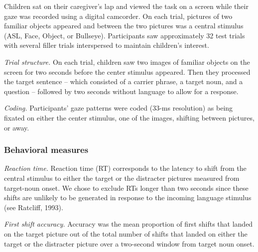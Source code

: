 \documentclass[10pt, letterpaper]{article}
\begin{document}
Children sat on their caregiver's lap and viewed the task on a screen
while their gaze was recorded using a digital camcorder. On each trial,
pictures of two familiar objects appeared and between the two pictures
was a central stimulus (ASL, Face, Object, or Bullseye). Participants
saw approximately 32 test trials with several filler trials interspersed
to maintain children's interest.

\emph{Trial structure.} On each trial, children saw two images of
familiar objects on the screen for two seconds before the center
stimulus appeared. Then they processed the target sentence -- which
consisted of a carrier phrase, a target noun, and a question -- followed
by two seconds without language to allow for a response.

\emph{Coding.} Participants' gaze patterns were coded (33-ms resolution)
as being fixated on either the center stimulus, one of the images,
shifting between pictures, or away.

\subsubsection{Behavioral measures}\label{behavioral-measures}

\emph{Reaction time.} Reaction time (RT) corresponds to the latency to
shift from the central stimulus to either the target or the distracter
pictures measured from target-noun onset. We chose to exclude RTs longer
than two seconds since these shifts are unlikely to be generated in
response to the incoming language stimulus (see Ratcliff, 1993).

\emph{First shift accuracy.} Accuracy was the mean proportion of first
shifts that landed on the target picture out of the total number of
shifts that landed on either the target or the distracter picture over a
two-second window from target noun onset.
\end{document}
